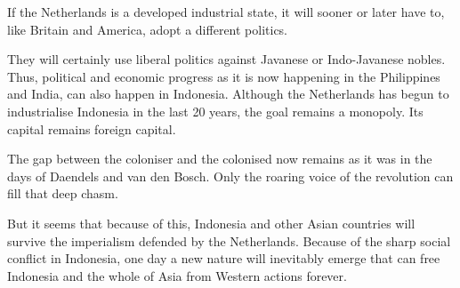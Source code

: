 If the Netherlands is a developed industrial state, it will sooner or later 
have to, like Britain and America, adopt a different politics.\nline

They will certainly use liberal politics against Javanese or Indo-Javanese nobles. 
Thus, political and economic progress as it is now happening in the Philippines 
and India, can also happen in Indonesia. Although the Netherlands has begun to 
industrialise Indonesia in the last 20 years, the goal remains a monopoly. Its capital remains foreign capital.\nline

The gap between the coloniser and the colonised now remains as it was in the days 
of Daendels and van den Bosch. Only the roaring voice of the revolution can fill that deep chasm.\nline

But it seems that because of this, Indonesia and other Asian countries 
will survive the imperialism defended by the Netherlands. Because of the 
sharp social conflict in Indonesia, one day a new nature will inevitably 
emerge that can free Indonesia and the whole of Asia from Western actions forever.\nline
